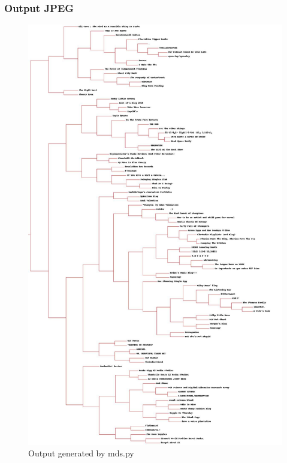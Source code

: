 \documentclass[12pt]{article}
\begin{document}
\subsubsection{Output JPEG}
\begin{figure}[ht]
\includegraphics[scale=0.2]{../../q5/dendogram.jpg}
\centering
\caption{Output generated by mds.py}
\label{Output generated by mds.py}
\end{figure}
\newpage


\cite{*}
\end{document}
